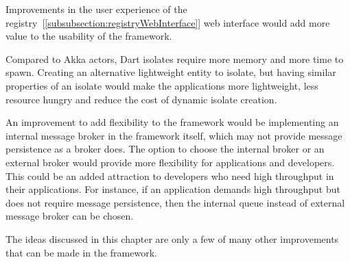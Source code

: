   Improvements in the user experience of the registry~[\autoref{subsubsection:registryWebInterface}] web interface would add more value to the usability of the framework.

  Compared to Akka actors, Dart isolates require more memory and more time to spawn. Creating an alternative lightweight entity to isolate, but having similar properties of an isolate would make the applications more lightweight, less resource hungry and reduce the cost of dynamic isolate creation.

  An improvement to add flexibility to the framework would be implementing an internal message broker in the framework itself, which may not provide message persistence as a broker does. The option to choose the internal broker or an external broker would provide more flexibility for applications and developers. This could be an added attraction to developers who need high throughput in their applications. For instance, if an application demands high throughput but does not require message persistence, then the internal queue instead of external message broker can be chosen.

  The ideas discussed in this chapter are only a few of many other improvements that can be made in the framework.
